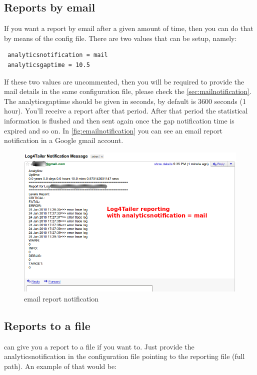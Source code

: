 \subsection{Reports by email}
If you want a report by email after a given amount of time, then you can do that by means 
of the config file. There are two values that can be setup, namely:

\begin{config}
\begin{verbatim}
 analyticsnotification = mail
 analyticsgaptime = 10.5
\end{verbatim}
\end{config}

If these two values are uncommented, then you will be required to provide the mail 
details in the same configuration file, please check the \autoref{sec:mailnotification}. The analyticsgaptime should be given in seconds, by default is 3600 seconds (1 hour). 
You'll receive a report after that period. After that period the statistical information is 
flushed and then sent again once the gap notification time is expired and so on.
In \autoref{fig:emailnotification} %
you can see an email report notification in a Google gmail account.

\begin{figure}[hb]
\includegraphics[scale=0.50]{emailnotification.png}
\caption{\logftailer{} email report notification}\label{fig:emailnotification}
\end{figure}


\subsection{Reports to a file}
\logftailer{} can give you a report to a file if you want to. Just provide the
analyticsnotification in the configuration file pointing to the reporting file
(full path). An example of that would be:


